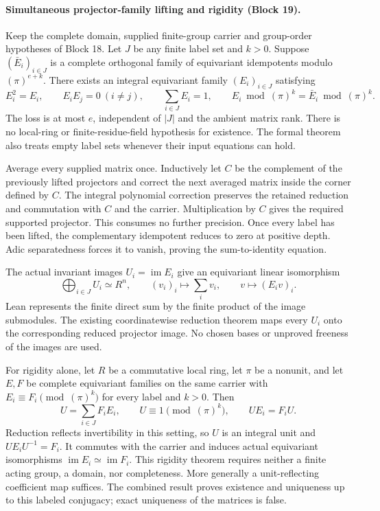 \documentclass[11pt]{article}
\theoremstyle{definition}
\theoremstyle{remark}
\begin{document}
\paragraph{Simultaneous projector-family lifting and rigidity (Block 19).}
Keep the complete domain, supplied finite-group carrier and group-order
hypotheses of Block 18. Let $J$ be any finite label set and $k>0$. Suppose
$(\bar E_i)_{i\in J}$ is a complete orthogonal family of equivariant
idempotents modulo $(\pi)^{e+k}$. There exists an integral equivariant
family $(E_i)_{i\in J}$ satisfying
\[
E_i^2=E_i,\qquad E_iE_j=0\ (i\ne j),\qquad
\sum_{i\in J}E_i=1,\qquad
E_i\bmod(\pi)^k=\bar E_i\bmod(\pi)^k.
\]
The loss is at most $e$, independent of $|J|$ and the ambient matrix rank.
There is no local-ring or finite-residue-field hypothesis for existence.
The formal theorem also treats empty label sets whenever their input
equations can hold.

Average every supplied matrix once. Inductively let $C$ be the complement
of the previously lifted projectors and correct the next averaged matrix
inside the corner defined by $C$. The integral polynomial correction
preserves the retained reduction and commutation with $C$ and the carrier.
Multiplication by $C$ gives the required supported projector. This consumes
no further precision. Once every label has been lifted, the complementary
idempotent reduces to zero at positive depth. Adic separatedness forces it
to vanish, proving the sum-to-identity equation.

The actual invariant images $U_i=\operatorname{im}E_i$ give an equivariant
linear isomorphism
\[
\bigoplus_{i\in J}U_i\simeq R^n,
\qquad (v_i)_i\longmapsto\sum_i v_i,
\qquad v\longmapsto(E_iv)_i.
\]
Lean represents the finite direct sum by the finite product of the image
submodules. The existing coordinatewise reduction theorem maps every
$U_i$ onto the corresponding reduced projector image. No chosen bases or
unproved freeness of the images are used.

For rigidity alone, let $R$ be a commutative local ring, let $\pi$ be a
nonunit, and let $E,F$ be complete equivariant families on the same carrier
with $E_i\equiv F_i\pmod{(\pi)^k}$ for every label and $k>0$. Then
\[
U=\sum_{i\in J}F_iE_i,\qquad
U\equiv1\pmod{(\pi)^k},\qquad UE_i=F_iU.
\]
Reduction reflects invertibility in this setting, so $U$ is an integral
unit and $UE_iU^{-1}=F_i$. It commutes with the carrier and induces actual
equivariant isomorphisms $\operatorname{im}E_i\simeq\operatorname{im}F_i$.
This rigidity theorem requires neither a finite acting group, a domain,
nor completeness. More generally a unit-reflecting coefficient map suffices.
The combined result proves existence and uniqueness up to this labeled
conjugacy; exact uniqueness of the matrices is false.
\end{document}
